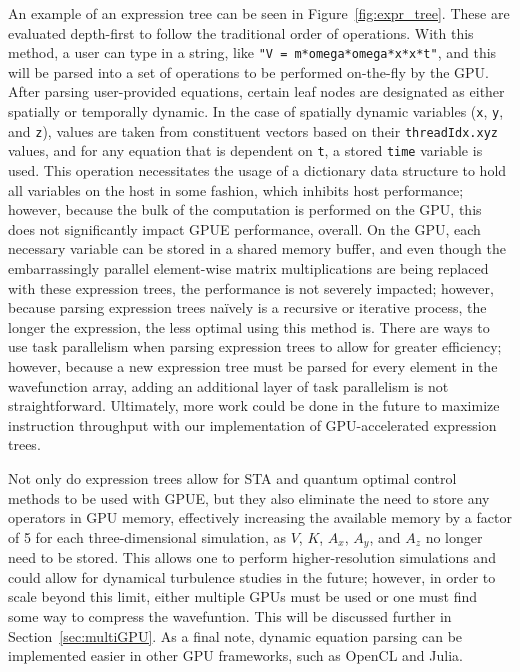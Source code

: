 An example of an expression tree can be seen in Figure~\ref{fig:expr_tree}.
These are evaluated depth-first to follow the traditional order of operations.
With this method, a user can type in a string, like \texttt{"V = m*omega*omega*x*x*t"}, and this will be parsed into a set of operations to be performed on-the-fly by the GPU.
After parsing user-provided equations, certain leaf nodes are designated as either spatially or temporally dynamic.
In the case of spatially dynamic variables (\texttt{x}, \texttt{y}, and \texttt{z}), values are taken from constituent vectors based on their \texttt{threadIdx.xyz} values, and for any equation that is dependent on \texttt{t}, a stored \texttt{time} variable is used.
This operation necessitates the usage of a dictionary data structure to hold all variables on the host in some fashion, which inhibits host performance; however, because the bulk of the computation is performed on the GPU, this does not significantly impact GPUE performance, overall.
On the GPU, each necessary variable can be stored in a shared memory buffer, and even though the embarrassingly parallel element-wise matrix multiplications are being replaced with these expression trees, the performance is not severely impacted; however,
because parsing expression trees na\"ively is a recursive or iterative process, the longer the expression, the less optimal using this method is.
There are ways to use task parallelism when parsing expression trees to allow for greater efficiency; however, because a new expression tree must be parsed for every element in the wavefunction array, adding an additional layer of task parallelism is not straightforward.
Ultimately, more work could be done in the future to maximize instruction throughput with our implementation of GPU-accelerated expression trees.

Not only do expression trees allow for STA and quantum optimal control methods to be used with GPUE, but they also eliminate the need to store any operators in GPU memory, effectively increasing the available memory by a factor of 5 for each three-dimensional simulation, as $V$, $K$, $A_x$, $A_y$, and $A_z$ no longer need to be stored.
This allows one to perform higher-resolution simulations and could allow for dynamical turbulence studies in the future; however, in order to scale beyond this limit, either multiple GPUs must be used or one must find some way to compress the wavefuntion.
This will be discussed further in Section~\ref{sec:multiGPU}.
As a final note, dynamic equation parsing can be implemented easier in other GPU frameworks, such as OpenCL and Julia.

